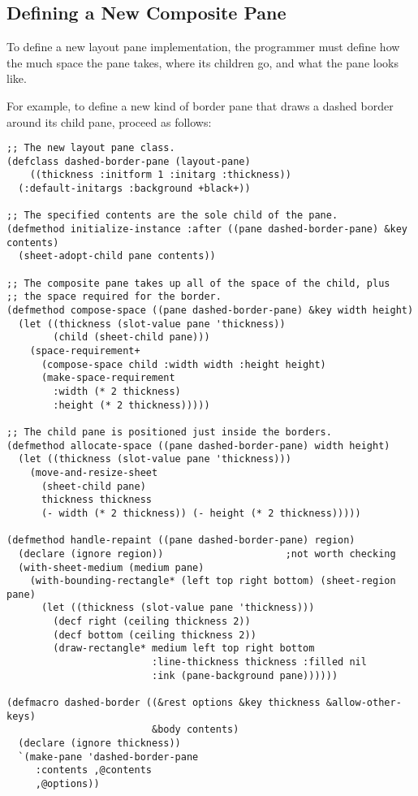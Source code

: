\subsection {Defining a New Composite Pane}

To define a new layout pane implementation, the programmer must define how the
much space the pane takes, where its children go, and what the pane looks like.

For example, to define a new kind of border pane that draws a dashed border
around its child pane, proceed as follows:

\begin{verbatim}
;; The new layout pane class.
(defclass dashed-border-pane (layout-pane)
    ((thickness :initform 1 :initarg :thickness))
  (:default-initargs :background +black+))

;; The specified contents are the sole child of the pane.
(defmethod initialize-instance :after ((pane dashed-border-pane) &key contents)
  (sheet-adopt-child pane contents))

;; The composite pane takes up all of the space of the child, plus
;; the space required for the border.
(defmethod compose-space ((pane dashed-border-pane) &key width height)
  (let ((thickness (slot-value pane 'thickness))
        (child (sheet-child pane)))
    (space-requirement+
      (compose-space child :width width :height height)
      (make-space-requirement
        :width (* 2 thickness)
        :height (* 2 thickness)))))

;; The child pane is positioned just inside the borders.
(defmethod allocate-space ((pane dashed-border-pane) width height)
  (let ((thickness (slot-value pane 'thickness)))
    (move-and-resize-sheet
      (sheet-child pane)
      thickness thickness
      (- width (* 2 thickness)) (- height (* 2 thickness)))))

(defmethod handle-repaint ((pane dashed-border-pane) region)
  (declare (ignore region))                     ;not worth checking
  (with-sheet-medium (medium pane)
    (with-bounding-rectangle* (left top right bottom) (sheet-region pane)
      (let ((thickness (slot-value pane 'thickness)))
        (decf right (ceiling thickness 2))
        (decf bottom (ceiling thickness 2))
        (draw-rectangle* medium left top right bottom
                         :line-thickness thickness :filled nil
                         :ink (pane-background pane))))))

(defmacro dashed-border ((&rest options &key thickness &allow-other-keys)
                         &body contents)
  (declare (ignore thickness))
  `(make-pane 'dashed-border-pane
     :contents ,@contents
     ,@options))
\end{verbatim}
